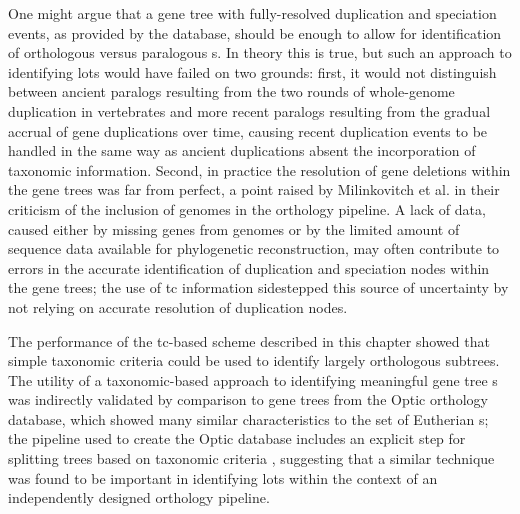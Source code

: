 One might argue that a gene tree with fully-resolved duplication and
speciation events, as provided by the \cmp database, should be enough
to allow for identification of orthologous versus paralogous
\subtr{}s. In theory this is true, but such an approach to identifying
\acp{lot} would have failed on two grounds: first, it would not
distinguish between ancient paralogs resulting from the two rounds of
whole-genome duplication in vertebrates and more recent paralogs
resulting from the gradual accrual of gene duplications over time,
causing recent duplication events to be handled in the same way as
ancient duplications absent the incorporation of taxonomic
information. Second, in practice the resolution of gene deletions
within the \cmp gene trees was far from perfect, a point raised by
Milinkovitch et al. \citeyearpar{Milinkovitch2010} in their criticism
of the inclusion of \lcv genomes in the \ens \cmp orthology
pipeline. A lack of data, caused either by missing genes from \lcv
genomes or by the limited amount of sequence data available for
phylogenetic reconstruction, may often contribute to errors in the
accurate identification of duplication and speciation nodes within the
\cmp gene trees; the use of \ac{tc} information sidestepped this
source of uncertainty by not relying on accurate resolution of
duplication nodes.

The performance of the \ac{tc}-based scheme described in this chapter
showed that simple taxonomic criteria could be used to identify
largely orthologous subtrees. The utility of a taxonomic-based
approach to identifying meaningful gene tree \subtr{}s was indirectly
validated by comparison to gene trees from the Optic orthology
database, which showed many similar characteristics to the set of
Eutherian \subtr{}s; the pipeline used to create the Optic database
includes an explicit step for splitting trees based on taxonomic
criteria \citep{Heger2008}, suggesting that a similar technique was
found to be important in identifying \acp{lot} within the context of
an independently designed orthology pipeline.
